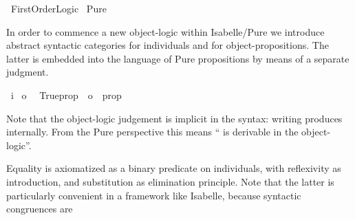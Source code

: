 %
\begin{isabellebody}%
\def\isabellecontext{First{\isaliteral{5F}{\isacharunderscore}}Order{\isaliteral{5F}{\isacharunderscore}}Logic}%
%
\isamarkuptrue%
%
\isadelimvisible
%
\endisadelimvisible
%
\isatagvisible
{}\isamarkupfalse%
\ First{}Order{}Logic\isanewline
{}\ Pure\isanewline
{}%
\endisatagvisible
{\isafoldvisible}%
%
\isadelimvisible
%
\endisadelimvisible
%
\begin{isamarkuptext}%
\noindent In order to commence a new object-logic within
  Isabelle/Pure we introduce abstract syntactic categories 
  for individuals and  for object-propositions.  The latter
  is embedded into the language of Pure propositions by means of a
  separate judgment.%
\end{isamarkuptext}%
\isamarkuptrue%
\isamarkupfalse%
\ i\isanewline
{}\isamarkupfalse%
\ o\isanewline
\isanewline
{}\isamarkupfalse%
\isanewline
\ \ Trueprop\ {}{}\ {}o\ {}\ prop{}\ \ \ \ {}{}{}{}\ {}{}%
\begin{isamarkuptext}%
\noindent Note that the object-logic judgement is implicit in the
  syntax: writing  produces  internally.
  From the Pure perspective this means `` is derivable in the
  object-logic''.%
\end{isamarkuptext}%
\isamarkuptrue%
%
\isamarkuptrue%
%
\begin{isamarkuptext}%
Equality is axiomatized as a binary predicate on individuals, with
  reflexivity as introduction, and substitution as elimination
  principle.  Note that the latter is particularly convenient in a
  framework like Isabelle, because syntactic congruences are

\end{isamarkuptext}
\end{isabellebody}
